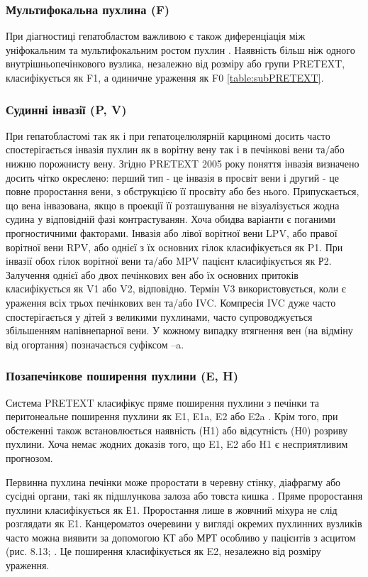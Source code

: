 \subsubsection{Мультифокальна пухлина (F)}
При діагностиці гепатобластом важливою є також диференціація між уніфокальним та мультифокальним ростом пухлин \cite{pmid24132546}. Наявність більш ніж одного внутрішньопечінкового вузлика, незалежно від розміру або групи PRETEXT, класифікується як F1, а одиничне ураження як F0 \ref{table:subPRETEXT}.
\subsubsection{Судинні інвазії (P, V)}
При гепатобластомі так як і при гепатоцелюлярній карциномі досить часто спостерігається інвазія пухлин як в ворітну вену так і в печінкові вени та/або нижню порожнисту вену. Згідно PRETEXT 2005 року поняття інвазія визначено досить чітко окреслено: перший тип - це інвазія в просвіт вени і другий - це повне проростання вени, з обструкцією її просвіту або без нього. Припускається, що вена інвазована, якщо в проекції її розташування не візуалізується жодна судина у відповідній фазі контрастуванян. Хоча обидва варіанти є поганими прогностичними факторами. 
Інвазія або лівої ворітної вени LPV, або правої ворітної вени RPV, або однієї з їх основних гілок класифікується як P1. При інвазії обох гілок ворітної вени та/або MPV пацієнт класифікується як Р2.
Залучення однієї або двох печінкових вен або їх основних притоків класифікується як V1 або V2, відповідно. Термін V3 використовується, коли є ураження всіх трьох печінкових вен та/або IVC. Компресія IVC дуже часто спостерігається у дітей з великими пухлинами, часто супроводжується збільшенням напівнепарної вени.
У кожному випадку втягнення вен (на відміну від огортання) позначається суфіксом –a.
\subsubsection{Позапечінкове поширення пухлини (E, H)}
Система PRETEXT класифікує пряме поширення пухлини з печінки та перитонеальне поширення пухлини як E1, E1a, E2 або E2a \cite{pmid23217875}. Крім того, при обстеженні також встановлюється наявність (H1) або відсутність (H0) розриву пухлини. Хоча немає жодних доказів того, що E1, E2 або H1 є несприятливим прогнозом.

Первинна пухлина печінки може проростати в черевну стінку, діафрагму або сусідні органи, такі як підшлункова залоза або товста кишка \cite{pmid23331862}. Пряме проростання пухлини класифікується як Е1. Проростання лише в жовчний міхура не слід розглядати як E1.
Канцероматоз очеревини у вигляді окремих пухлинних вузликів часто можна виявити за допомогою КТ або МРТ особливо у пацієнтів з асцитом (рис. 8.13; \cite{pmid23831416}. Це поширення класифікується як E2, незалежно від розміру ураження.

